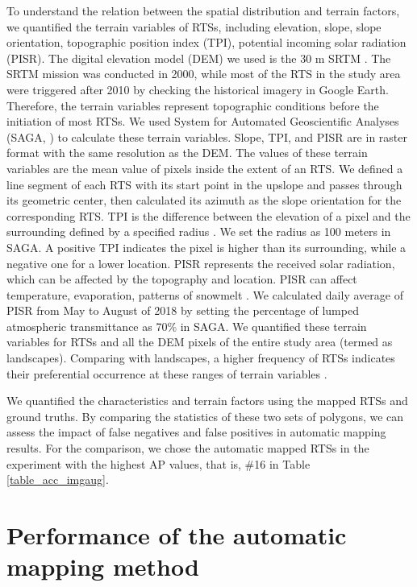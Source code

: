 \documentclass[preprint,12pt,authoryear]{elsarticle}
\begin{document}
To understand the relation between the spatial distribution and terrain factors, we quantified the terrain variables of RTSs, including elevation, slope, slope orientation, topographic position index (TPI), potential incoming solar radiation (PISR). The digital elevation model (DEM) we used is the 30 m SRTM \citep{farr2007shuttle}. The SRTM mission was conducted in 2000, while most of the RTS in the study area were triggered after 2010 by checking the historical imagery in Google Earth. Therefore, the terrain variables represent topographic conditions before the initiation of most RTSs. We used System for Automated Geoscientific Analyses (SAGA, \citealp{conrad2015system}) to calculate these terrain variables. Slope, TPI, and PISR are in raster format with the same resolution as the DEM. The values of these terrain variables are the mean value of pixels inside the extent of an RTS. We defined a line segment of each RTS with its start point in the upslope and passes through its geometric center, then calculated its azimuth as the slope orientation for the corresponding RTS. TPI is the difference between the elevation of a pixel and the surrounding defined by a specified radius \citep{guisan1999glm, reu2013application}. We set the radius as 100 meters in SAGA. A positive TPI indicates the pixel is higher than its surrounding, while a negative one for a lower location. PISR represents the received solar radiation, which can be affected by the topography and location. PISR can affect temperature, evaporation, patterns of snowmelt \citep{bohner2009land}. We calculated daily average of PISR from May to August of 2018 by setting the percentage of lumped atmospheric transmittance as 70\% in SAGA. We quantified these terrain variables for RTSs and all the DEM pixels of the entire study area (termed as landscapes). Comparing with landscapes, a higher frequency of RTSs indicates their preferential occurrence at these ranges of terrain variables \citep{lacelle_distribution_2015}. 

We quantified the characteristics and terrain factors using the mapped RTSs and ground truths. By comparing the statistics of these two sets of polygons, we can assess the impact of false negatives and false positives in automatic mapping results. For the comparison, we chose the automatic mapped RTSs in the experiment with the highest AP values, that is, \#16 in Table \ref{table_acc_imgaug}.  


\section{Performance of the automatic mapping method}
\label{sec_performance}
\end{document}
